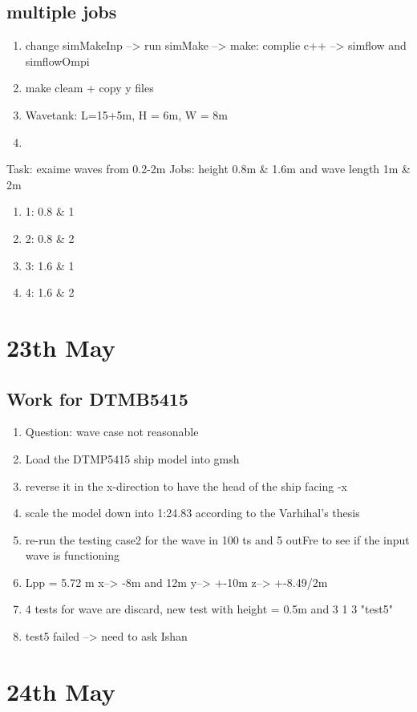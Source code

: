 \documentclass[12pt]{article} %
\begin{document}
\subsection{multiple jobs}
\begin{enumerate}
    \item change simMakeInp --> run simMake --> make: complie c++ --> simflow and simflowOmpi
    \item make cleam + copy y files
    \item Wavetank: L=15+5m, H = 6m, W = 8m
    \item 
\end{enumerate}
Task: exaime waves from 0.2-2m 
Jobs: height 0.8m \& 1.6m and wave length 1m \& 2m
\begin{enumerate}
    \item 1: 0.8 \& 1
    \item 2: 0.8 \& 2
    \item 3: 1.6 \& 1
    \item 4: 1.6 \& 2
\end{enumerate}

\section{23th May}
\subsection{Work for DTMB5415}
\begin{enumerate}
    \item Question: wave case not reasonable
    \item Load the DTMP5415 ship model into gmsh
    \item reverse it in the x-direction to have the head of the ship facing -x
    \item scale the model down into 1:24.83 according to the Varhihal's thesis
    \item re-run the testing case2 for the wave in 100 ts and 5 outFre to see if the input wave is functioning
    \item Lpp = 5.72 m x--> -8m and 12m y--> +-10m z--> +-8.49/2m
    \item 4 tests for wave are discard, new test with height = 0.5m and 3 1 3 "test5"
    \item test5 failed --> need to ask Ishan
\end{enumerate}
\section{24th May}
\end{document}
